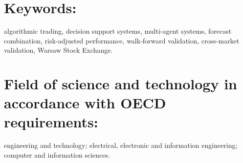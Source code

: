 \section*{Keywords:}
\noindent algorithmic trading, decision support systems, multi-agent systems, forecast combination, risk-adjusted performance, walk-forward validation, cross-market validation, Warsaw Stock Exchange.

\section*{Field of science and technology in accordance with OECD requirements:}
\noindent engineering and technology; electrical, electronic and information engineering; computer and information sciences.
